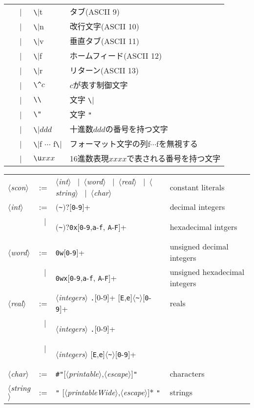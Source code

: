 \documentclass{jbook}
\newcommand{\vbar}{\mbox{\ $|$\ }}
\newcommand{\nonterm}[1]{\mbox{$\langle$}{\it #1}\mbox{$\rangle$}}
\newcommand{\term}[1]{\mbox{{\tt #1}}}
\newcommand{\optionalBegin}{\mbox{$($}}
\newcommand{\optionalEnd}{\mbox{$)?$}}
\begin{document}
\begin{description}
\begin{center}
\begin{tabular}{lcll}
&\vbar&\verb|\|t & タブ(ASCII 9)\\
&\vbar&\verb|\|n & 改行文字(ASCII 10)\\
&\vbar&\verb|\|v & 垂直タブ(ASCII 11)\\
&\vbar&\verb|\|f & ホームフィード(ASCII 12)\\
&\vbar&\verb|\|r & リターン(ASCII 13)\\
&\vbar&\verb|\^|$c$ & $c$が表す制御文字\\
&\vbar&\verb|\\| & 文字 \verb|\|\\
&\vbar&\verb|\"| & 文字 \verb|"|\\   %
&\vbar&\verb|\|$ddd$ &十進数$ddd$の番号を持つ文字\\
&\vbar&\verb|\|f 
$\cdots$ f\verb|\|& フォーマット文字の列f$\cdots$fを無視する
\\
&\vbar&\verb|\u|$xxx$&
16進数表現$xxxx$で表される番号を持つ文字
\\
\end{tabular}
\end{center}
\else%
\begin{center}
\begin{tabular}{lcll}
\nonterm{scon} &:=& 
\nonterm{int} 
\vbar \nonterm{word} 
\vbar \nonterm{real} 
\vbar \nonterm{string} 
\vbar \nonterm{char}
&constant literals\\
\nonterm{int} &:=& 
\optionalBegin\verb|~|\optionalEnd[\term{0}-\term{9}]+ & decimal integers\\
&\vbar& \optionalBegin\verb|~|\optionalEnd\verb|0x|[\term{0}-\term{9},\term{a}-\term{f},%
\term{A}-\term{F}]+& hexadecimal intgers
\\[0.5ex]
\nonterm{word} &:=& \verb|0w|[\term{0}-\term{9}]+&
unsigned decimal integers
\\
&\vbar&\verb|0wx|[\term{0}-\term{9},\term{a}-\term{f},%
\term{A}-\term{F}]+& 
unsigned hexadecimal integers
\\[0.5ex]
\nonterm{real}&:=& 
\nonterm{integers} \term{.}[0-9]+
[\term{E},\term{e}]$\langle$\verb|~|$\rangle$[\term{0}-\term{9}]+
&reals\\
&\vbar&\nonterm{integers} \term{.}[0-9]+ 
&\\
&\vbar&\nonterm{integers} 
[\term{E},\term{e}]$\langle$\verb|~|$\rangle$[\term{0}-\term{9}]+
&\\
\nonterm{char} &:=& \verb|#"|[\nonterm{printable},\nonterm{escape}]\verb|"|&characters\\
\nonterm{string} &:=& \verb|"| [\nonterm{printableWide},\nonterm{escape}]$*$ \verb|"|&strings\\

\end{tabular}
\end{center}
\end{description}
\end{document}
